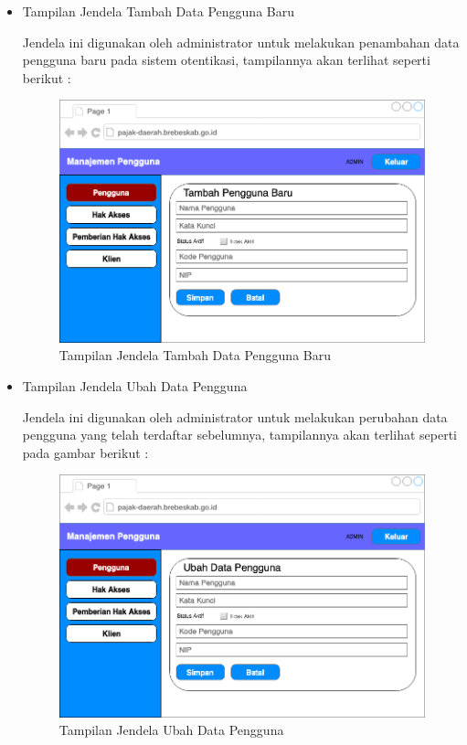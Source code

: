 \documentclass[pdftex,12pt, oneside]{article}
\begin{document}
\begin{itemize}
	\item Tampilan Jendela Tambah Data Pengguna Baru
	
	Jendela ini digunakan oleh administrator untuk melakukan penambahan data pengguna baru pada sistem otentikasi, tampilannya akan terlihat seperti berikut :
	
	\begin{figure}[H]
		\centering
		\includegraphics[width=1\textwidth]{./resources/add-user-ui}
		\caption{Tampilan Jendela Tambah Data Pengguna Baru}
		\label{fig:add-user-ui}
	\end{figure}
	
	\item Tampilan Jendela Ubah Data Pengguna
	
	Jendela ini digunakan oleh administrator untuk melakukan perubahan data pengguna yang telah terdaftar sebelumnya, tampilannya akan terlihat seperti pada gambar berikut :
	
	\begin{figure}[H]
		\centering
		\includegraphics[width=1\textwidth]{./resources/edit-user-ui}
		\caption{Tampilan Jendela Ubah Data Pengguna}
		\label{fig:edit-user-ui}
	\end{figure}
	

\end{itemize}
\end{document}
